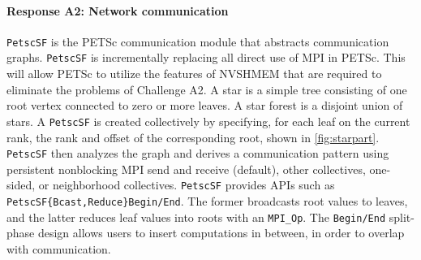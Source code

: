 \documentclass[5p,times]{elsarticle}
\begin{document}
\paragraph{Response A2: Network communication } 
\label{subsec:challengeMPIGPUSF}

\texttt{PetscSF} is the PETSc communication module that abstracts communication graphs. 
{\tt PetscSF} is incrementally replacing all direct use of MPI in PETSc.  This will allow PETSc to utilize the features of NVSHMEM that are required
to eliminate the problems of Challenge A2. A star is a simple tree consisting of one root vertex connected to zero or more leaves. A star forest is a disjoint union of stars. 
 A \texttt{PetscSF} is created collectively by specifying, for each leaf on the current rank, the rank and offset of the corresponding root, shown in \autoref{fig:starpart}. {\tt PetscSF} then analyzes the graph and derives a communication pattern  using persistent nonblocking MPI send and receive (default), other collectives, one-sided, or neighborhood collectives. {\tt PetscSF} provides APIs such as \texttt{PetscSF\{Bcast,Reduce\}Begin/End}. The former
broadcasts root values to leaves, and the latter reduces leaf values into roots with an   
\texttt{MPI\_Op}. The \texttt{Begin/End} split-phase design allows users to
insert computations in between, in order to overlap with communication.
\end{document}
